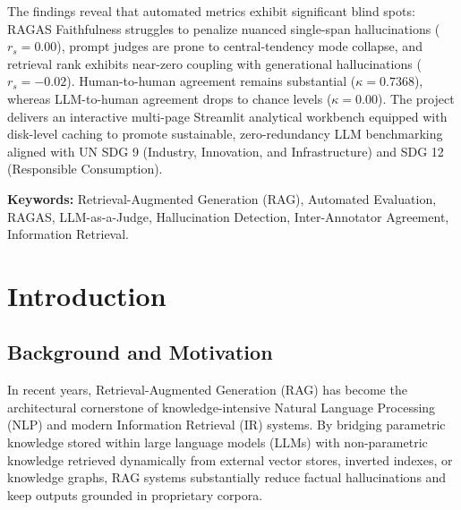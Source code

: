 \documentclass[11pt,a4paper]{article}
\begin{document}
The findings reveal that automated metrics exhibit significant blind spots: RAGAS Faithfulness struggles to penalize nuanced single-span hallucinations ($r_s = 0.00$), prompt judges are prone to central-tendency mode collapse, and retrieval rank exhibits near-zero coupling with generational hallucinations ($r_s = -0.02$). Human-to-human agreement remains substantial ($\kappa = 0.7368$), whereas LLM-to-human agreement drops to chance levels ($\kappa = 0.00$). The project delivers an interactive multi-page Streamlit analytical workbench equipped with disk-level caching to promote sustainable, zero-redundancy LLM benchmarking aligned with UN SDG 9 (Industry, Innovation, and Infrastructure) and SDG 12 (Responsible Consumption).

\vspace{0.4cm}
\textbf{Keywords:} Retrieval-Augmented Generation (RAG), Automated Evaluation, RAGAS, LLM-as-a-Judge, Hallucination Detection, Inter-Annotator Agreement, Information Retrieval.
\newpage

\begingroup
\setlength{\parskip}{0pt}
\renewcommand{\baselinestretch}{0.94}\normalsize
\makeatletter
\renewcommand*\l@section[2]{%
  \ifnum \c@tocdepth >\z@
    \addpenalty\@secpenalty
    \addvspace{0.45em \@plus\p@}%
    \setlength\@tempdima{1.5em}%
    \begingroup
      \parindent \z@ \rightskip \@pnumwidth
      \parfillskip -\@pnumwidth
      \leavevmode \bfseries
      \advance\leftskip\@tempdima
      \hskip -\leftskip
      #1\nobreak\hfil \nobreak\hb@xt@\@pnumwidth{\hss #2}\par
    \endgroup
  \fi}
\makeatother
\tableofcontents
\endgroup
\newpage


\section{Introduction}

\subsection{Background and Motivation}
In recent years, Retrieval-Augmented Generation (RAG) \cite{lewis2020retrieval} has become the architectural cornerstone of knowledge-intensive Natural Language Processing (NLP) and modern Information Retrieval (IR) systems. By bridging parametric knowledge stored within large language models (LLMs) with non-parametric knowledge retrieved dynamically from external vector stores, inverted indexes, or knowledge graphs, RAG systems substantially reduce factual hallucinations and keep outputs grounded in proprietary corpora. 
\end{document}
